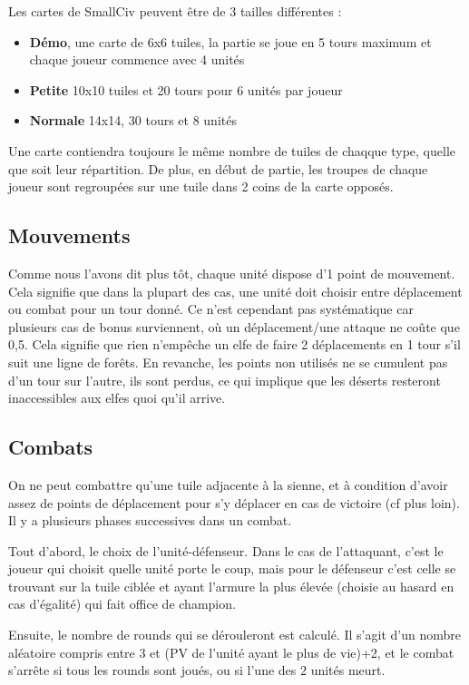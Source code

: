 Les cartes de SmallCiv peuvent être de 3 tailles différentes :
\begin{itemize}\renewcommand{\labelitemi}{$\bullet$}
\item \textbf{Démo}, une carte de 6x6 tuiles, la partie se joue en 5 tours maximum et chaque joueur commence avec 4 unités
\item \textbf{Petite}  10x10 tuiles et 20 tours pour 6 unités par joueur
\item \textbf{Normale} 14x14, 30 tours et 8 unités
\end{itemize}
Une carte contiendra toujours le même nombre de tuiles de chaqque type, quelle que soit leur répartition. De plus, en début de partie, les troupes de chaque joueur sont regroupées sur une tuile dans 2 coins de la carte opposés. 

\subsection{Mouvements}
Comme nous l'avons dit plus tôt, chaque unité dispose d'1 point de mouvement. Cela signifie que dans la plupart des cas, une unité doit choisir entre déplacement ou combat pour un tour donné. Ce n'est cependant pas systématique car plusieurs cas de bonus surviennent, où un déplacement/une attaque ne coûte que 0,5. Cela signifie que rien n'empêche un elfe de faire 2 déplacements en 1 tour s'il suit une ligne de forêts.\newline
En revanche, les points non utilisés ne se cumulent pas d'un tour sur l'autre, ils sont perdus, ce qui implique que les déserts resteront inaccessibles aux elfes quoi qu'il arrive. 

\subsection{Combats}
On ne peut combattre qu'une tuile adjacente à la sienne, et à condition d'avoir assez de points de déplacement pour s'y déplacer en cas de victoire (cf plus loin). Il y a plusieurs phases successives dans un combat. \newline

Tout d'abord, le choix de l'unité-défenseur. Dans le cas de l'attaquant, c'est le joueur qui choisit quelle unité porte le coup, mais pour le défenseur c'est celle se trouvant sur la tuile ciblée et ayant l'armure la plus élevée (choisie au hasard en cas d'égalité) qui fait office de champion. \newline

Ensuite, le nombre de rounds qui se dérouleront est calculé. Il s'agit d'un nombre aléatoire compris entre 3 et (PV de l'unité ayant le plus de vie)+2, et le combat s'arrête si tous les rounds sont joués, ou si l'une des 2 unités meurt.\newline

